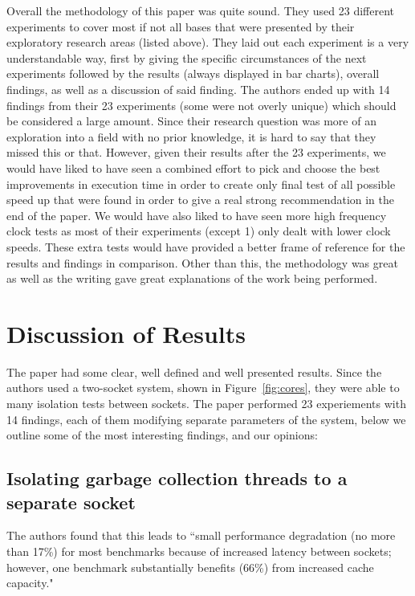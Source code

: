 \documentclass[conference]{IEEEtran}
\begin{document}
Overall the methodology of this paper was quite sound. They used 23 different experiments to
cover most if not all bases that were presented by their exploratory research areas (listed above).
They laid out each experiment is a very understandable way, first by giving the specific circumstances
of the next experiments followed by the results (always displayed in bar charts), overall findings, as
well as a discussion of said finding. The authors ended up with 14 findings from their 23 experiments
(some were not overly unique) which should be considered a large amount. Since their research question
was more of an exploration into a field with no prior knowledge, it is hard to say that they missed
this or that. However, given their results after the 23 experiments, we would have liked to have seen
a combined effort to pick and choose the best improvements in execution time in order to create
only final test of all possible speed up that were found in order to give a real strong recommendation
in the end of the paper. We would have also liked to have seen more high frequency clock tests as most
of their experiments (except 1) only dealt with lower clock speeds. These extra tests would have 
provided a better frame of reference for the results and findings in comparison.
Other than this, the methodology was great as well as the writing gave great
explanations of the work being performed.


\section{Discussion of Results}
The paper had some clear, well defined and well presented results.  Since the authors used a two-socket system, shown in Figure~\ref{fig:cores}, they were able to many isolation tests between sockets.  The paper performed 23 experiements with 14 findings, each of them modifying separate parameters of the system, below we outline some of the most interesting findings, and our opinions:

\subsection{Isolating garbage collection threads to a separate socket}
 
The authors found that this leads to ``small performance degradation (no more than 17\%) for most benchmarks because of increased latency between sockets; however, one benchmark substantially benefits (66\%) from increased cache capacity."
\end{document}
